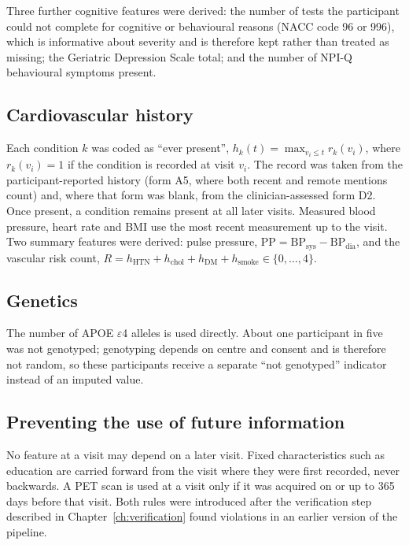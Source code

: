 Three further cognitive features were derived: the number of tests the participant could not complete for cognitive or behavioural reasons (NACC code 96 or 996), which is informative about severity and is therefore kept rather than treated as missing; the Geriatric Depression Scale total; and the number of NPI-Q behavioural symptoms present.

\subsection{Cardiovascular history}

Each condition $k$ was coded as ``ever present'', $h_k(t) = \max_{v_i \le t} r_k(v_i)$, where $r_k(v_i) = 1$ if the condition is recorded at visit $v_i$. The record was taken from the participant-reported history (form A5, where both recent and remote mentions count) and, where that form was blank, from the clinician-assessed form D2. Once present, a condition remains present at all later visits. Measured blood pressure, heart rate and BMI use the most recent measurement up to the visit. Two summary features were derived: pulse pressure, $\text{PP} = \text{BP}_{\text{sys}} - \text{BP}_{\text{dia}}$, and the vascular risk count, $R = h_{\text{HTN}} + h_{\text{chol}} + h_{\text{DM}} + h_{\text{smoke}} \in \{0, \dots, 4\}$.

\subsection{Genetics}

The number of APOE $\varepsilon$4 alleles is used directly. About one participant in five was not genotyped; genotyping depends on centre and consent and is therefore not random, so these participants receive a separate ``not genotyped'' indicator instead of an imputed value.

\subsection{Preventing the use of future information}
\label{sec:pettiming}

No feature at a visit may depend on a later visit. Fixed characteristics such as education are carried forward from the visit where they were first recorded, never backwards. A PET scan is used at a visit only if it was acquired on or up to 365 days before that visit. Both rules were introduced after the verification step described in Chapter~\ref{ch:verification} found violations in an earlier version of the pipeline.

